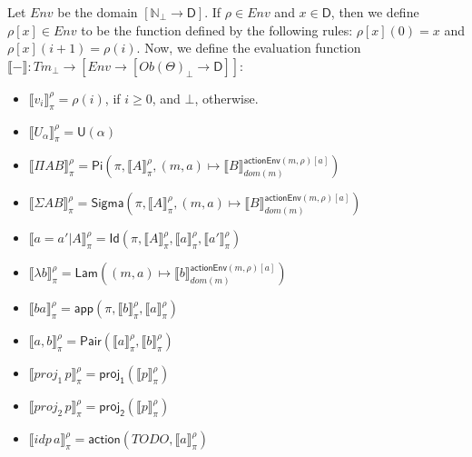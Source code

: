 \documentclass{amsart}
\theoremstyle{definition}
\theoremstyle{remark}
\newcommand{\D}{\mathsf{D}}
\newcommand{\nats}{\mathbb{N}}
\numberwithin{table}{section}
\begin{document}
Let $Env$ be the domain $[\nats_\bot \to \D]$.
If $\rho \in Env$ and $x \in \D$, then we define $\rho[x] \in Env$ to be the function defined by the following rules: $\rho[x](0) = x$ and $\rho[x](i+1) = \rho(i)$.
Now, we define the evaluation function $\llbracket - \rrbracket : Tm_\bot \to [Env \to [Ob(\Theta)_\bot \to \D]]$:
\begin{itemize}
\item[] $\llbracket v_i \rrbracket^\rho_\pi = \rho(i)$, if $i \geq 0$, and $\bot$, otherwise.
\item[] $\llbracket U_\alpha \rrbracket^\rho_\pi = \mathsf{U}(\alpha)$
\item[] $\llbracket \Pi A B \rrbracket^\rho_\pi = \mathsf{Pi}(\pi, \llbracket A \rrbracket^\rho_\pi, (m, a) \mapsto \llbracket B \rrbracket^{\mathsf{actionEnv}(m,\rho)[a]}_{dom(m)})$
\item[] $\llbracket \Sigma A B \rrbracket^\rho_\pi = \mathsf{Sigma}(\pi, \llbracket A \rrbracket^\rho_\pi, (m, a) \mapsto \llbracket B \rrbracket^{\mathsf{actionEnv}(m,\rho)[a]}_{dom(m)})$
\item[] $\llbracket a = a' | A \rrbracket^\rho_\pi = \mathsf{Id}(\pi, \llbracket A \rrbracket^\rho_\pi, \llbracket a \rrbracket^\rho_\pi, \llbracket a' \rrbracket^\rho_\pi)$
\item[] $\llbracket \lambda b \rrbracket^\rho_\pi = \mathsf{Lam}((m, a) \mapsto \llbracket b \rrbracket^{\mathsf{actionEnv}(m,\rho)[a]}_{dom(m)})$
\item[] $\llbracket b a \rrbracket^\rho_\pi = \mathsf{app}(\pi, \llbracket b \rrbracket^\rho_\pi, \llbracket a \rrbracket^\rho_\pi)$
\item[] $\llbracket a, b \rrbracket^\rho_\pi = \mathsf{Pair}(\llbracket a \rrbracket^\rho_\pi, \llbracket b \rrbracket^\rho_\pi)$
\item[] $\llbracket proj_1\,p \rrbracket^\rho_\pi = \mathsf{proj_1}(\llbracket p \rrbracket^\rho_\pi)$
\item[] $\llbracket proj_2\,p \rrbracket^\rho_\pi = \mathsf{proj_2}(\llbracket p \rrbracket^\rho_\pi)$
\item[] $\llbracket idp\,a \rrbracket^\rho_\pi = \mathsf{action}(TODO,\llbracket a \rrbracket^\rho_\pi)$
\end{itemize}
\end{document}
